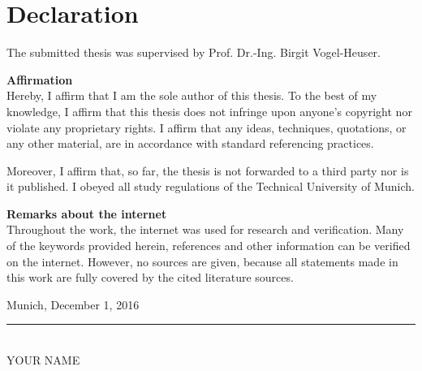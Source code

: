 \chapter*{Declaration}
\thispagestyle{plain}
%
The submitted thesis was supervised by Prof. Dr.-Ing. Birgit Vogel-Heuser.
\vspace{1cm}

\textbf{Affirmation}\\
Hereby, I affirm that I am the sole author of this thesis. To the best of my knowledge, I affirm
that this thesis does not infringe upon anyone's copyright nor violate any proprietary rights.
I affirm that any ideas, techniques, quotations, or any other material, are in accordance with
standard referencing practices.

Moreover, I affirm that, so far, the thesis is not forwarded to a third party nor is it published.
I obeyed all study regulations of the Technical University of Munich.

\vspace{1cm}

\textbf{Remarks about the internet}\\
Throughout the work, the internet was used for research and verification. Many of the
keywords provided herein, references and other information can be verified on the internet.
However, no sources are given, because all statements made in this work are fully covered by
the cited literature sources.

\vspace*{2.5cm}
\hspace*{1cm} Munich, December 1, 2016
\hspace*{3cm}\rule[-3pt]{5cm}{1pt} \hspace*{2cm}\\
\hspace*{9.3cm} YOUR NAME
